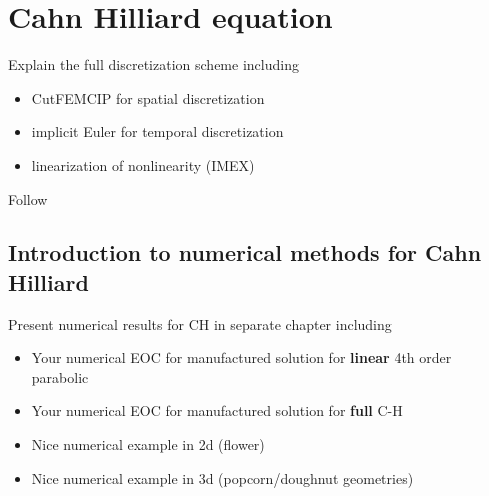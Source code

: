 
\newpage
\section{Cahn Hilliard equation }%
\label{sec:cahn_hilliard_equation}

Explain the full discretization scheme including

\begin{itemize}
    \item CutFEMCIP for spatial discretization
    \item implicit Euler for temporal discretization
    \item linearization of nonlinearity (IMEX)
\end{itemize}
Follow \cite{feng2007fully}


\subsection{Introduction to numerical methods for Cahn Hilliard}%
\label{sub:introduction_to_numerical_methods_for_cahn_hilliard}

Present numerical results for CH in separate chapter including
\begin{itemize}
    \item Your numerical EOC for  manufactured solution for \textbf{linear} 4th order parabolic
    \item Your numerical EOC for  manufactured solution for \textbf{full} C-H
    \item Nice numerical example in 2d (flower)
    \item Nice numerical example in 3d (popcorn/doughnut geometries)
\end{itemize}



